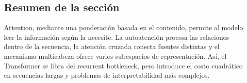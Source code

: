 
\subsection{Resumen de la sección}

Attention, mediante una ponderación basada en el contenido, permite al modelo leer la información según la necesite. La autoatención procesa las relaciones dentro de la secuencia, la atención cruzada conecta fuentes distintas y el mecanismo multicabeza ofrece varios subespacios de representación. Así, el Transformer se libra del recurrent bottleneck, pero introduce el costo cuadrático en secuencias largas y problemas de interpretabilidad más complejos.

